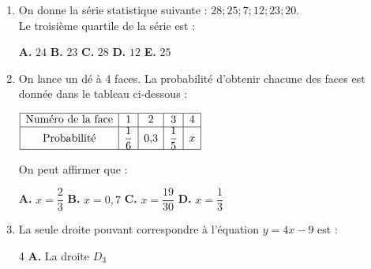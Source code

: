 \documentclass[a4paper,11pt]{article}
\begin{document}
\begin{seance}{} %

\begin{enumerate}
\item On donne la série statistique suivante :
      $28  ;  25  ;  7  ;  12  ;  23  ;  20$.\\
      Le troisième quartile de la série est :

\medskip
\begin{center}
\textbf{\textcolor{Couleur1}{A.}} $24$ \qquad \textbf{\textcolor{Couleur1}{B.}} $23$ \qquad \textbf{\textcolor{Couleur1}{C.}} $28$ \qquad \textbf{\textcolor{Couleur1}{D.}} $12$ \qquad \textbf{\textcolor{Couleur1}{E.}} $25$
\end{center}


\item On lance un dé à 4 faces. La probabilité d'obtenir chacune des faces est donnée dans le tableau ci-dessous :

\medskip
\begin{center}
$\renewcommand{\arraystretch}{1}
\begin{array}{|c|c|c|c|c|}
\hline
\text{Numéro de la face} & 1 & 2 & 3 & 4\\
\hline
\text{Probabilité} & \dfrac{1}{6} & 0{,}3 & \dfrac{1}{5} & x\\
\hline
 \end{array}
\renewcommand{\arraystretch}{1}$

\end{center}


On peut affirmer que :

\medskip
\begin{center}
\textbf{\textcolor{Couleur1}{A.}} $x=\dfrac{2}{3}$ \qquad \textbf{\textcolor{Couleur1}{B.}} $x=0{,}7$ \qquad \textbf{\textcolor{Couleur1}{C.}} $x=\dfrac{19}{30}$ \qquad \textbf{\textcolor{Couleur1}{D.}} $x=\dfrac{1}{3}$
\end{center}


\item La seule droite pouvant correspondre à l'équation $y=4x-9$ est  :\\

\begin{multicols}{4}
\textbf{\textcolor{Couleur1}{A.}} La droite $D_3$ \\
\begin{tikzpicture}[baseline,scale = 0.4]


\end{tikzpicture}
\end{multicols}
\end{enumerate}
\end{seance}
\end{document}
